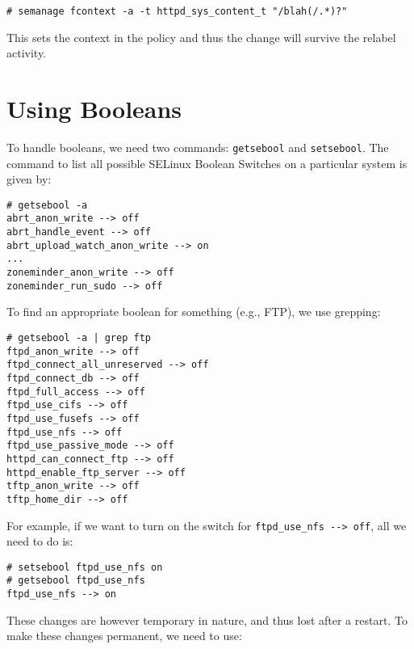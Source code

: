\vspace{-15pt}
\begin{verbatim}
# semanage fcontext -a -t httpd_sys_content_t "/blah(/.*)?"
\end{verbatim}
\vspace{-10pt}

\noindent
This sets the context in the policy and thus the change will survive the relabel activity. 

\section{Using Booleans}
To handle booleans, we need two commands: \verb|getsebool| and \verb|setsebool|. The command to list all possible SELinux Boolean Switches on a particular system is given by:

\vspace{-15pt}
\begin{verbatim}
# getsebool -a
abrt_anon_write --> off
abrt_handle_event --> off
abrt_upload_watch_anon_write --> on
...
zoneminder_anon_write --> off
zoneminder_run_sudo --> off
\end{verbatim}
\vspace{-10pt}

\noindent
To find an appropriate boolean for something (e.g., FTP), we use grepping:

\vspace{-15pt}
\begin{verbatim}
# getsebool -a | grep ftp
ftpd_anon_write --> off
ftpd_connect_all_unreserved --> off
ftpd_connect_db --> off
ftpd_full_access --> off
ftpd_use_cifs --> off
ftpd_use_fusefs --> off
ftpd_use_nfs --> off
ftpd_use_passive_mode --> off
httpd_can_connect_ftp --> off
httpd_enable_ftp_server --> off
tftp_anon_write --> off
tftp_home_dir --> off
\end{verbatim}
\vspace{-10pt}

\noindent
For example, if we want to turn on the switch for \verb|ftpd_use_nfs --> off|, all we need to do is:

\vspace{-15pt}
\begin{verbatim}
# setsebool ftpd_use_nfs on
# getsebool ftpd_use_nfs
ftpd_use_nfs --> on

\end{verbatim}
\vspace{-10pt}

\noindent
These changes are however temporary in nature, and thus lost after a restart. To make these changes permanent, we need to use: 

